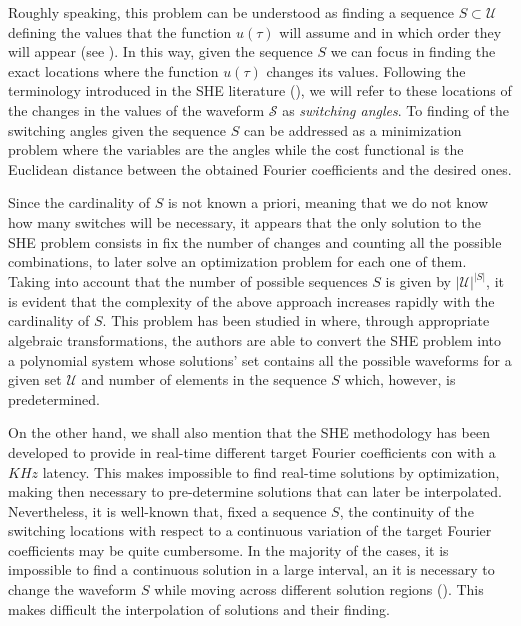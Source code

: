 %
%
Roughly speaking, this problem can be understood as finding a sequence $S\subset \mathcal{U}$ defining the values that the function $u(\tau)$ will assume and in which order they will appear (see \cite{Konstantinou2010}).
%
In this way, given the sequence $S$ we can focus in finding the exact locations where the function $u(\tau)$ changes its values.
%
Following the terminology introduced in the SHE literature (\cite{Yang2015,Konstantinou2010,Sun1996}), we will refer to these locations of the changes in the values of the waveform $\mathcal{S}$ as \textit{switching angles}.
%
To finding of the switching angles given the sequence $S$ can be addressed as a minimization problem where the variables are the angles while the cost functional is the Euclidean distance between the obtained Fourier coefficients and the desired ones.

Since the cardinality of $S$ is not known a priori, meaning that we do not know how many switches will be necessary, it appears that the only solution to the SHE problem consists in fix the number of changes and counting all the possible combinations, to later solve an optimization problem for each one of them.
%
Taking into account that the number of possible sequences $S$ is given by $|\mathcal{U}|^{|S|}$, it is evident that the complexity of the above approach increases rapidly with the cardinality of $S$.
%
This problem has been studied in \cite{Yang2015} where, through appropriate algebraic transformations, the authors are able to convert the SHE problem into a polynomial system whose solutions' set contains all the possible waveforms for a given set $\mathcal{U}$ and number of elements in the sequence $S$ which, however, is predetermined. 
%

On the other hand, we shall also mention that the SHE methodology has been developed to provide in real-time different target Fourier coefficients con with a $KHz$ latency. 
%
This makes impossible to find real-time solutions by optimization, making then necessary to pre-determine solutions that can later be interpolated.
%
Nevertheless, it is well-known that, fixed a sequence $S$, the continuity of the switching locations with respect to a continuous variation of the target Fourier coefficients may be quite cumbersome. 
%
In the majority of the cases, it is impossible to find a continuous solution in a large interval, an it is necessary to change the waveform $S$ while moving across different solution regions (\cite{Yang2015,Yang2017}). This makes difficult the interpolation of solutions and their finding.

